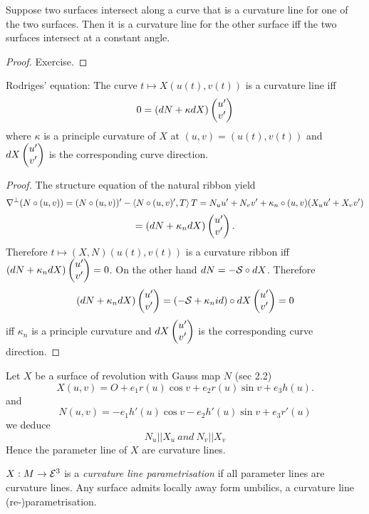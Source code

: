 \begin{theorem}
	Suppose two surfaces intersect along a curve that is a curvature line for one of the two surfaces. Then it is a curvature line for the other surface iff the two surfaces intersect at a constant angle.
\end{theorem}

\begin{proof}
	Exercise.
\end{proof}

\begin{definition}
	Rodriges' equation: The curve $t \mapsto X(u(t),v(t))$ is a curvature line iff 
		\[ 0 = (dN + \kappa  dX) \begin{pmatrix} u'\\v' \end{pmatrix} \]
	where $\kappa$ is a principle curvature of $X$ at $(u,v)= (u(t),v(t))$ and $dX \begin{pmatrix} u'\\v' \end{pmatrix}$ is the corresponding curve direction.
\end{definition}

\begin{proof}
	The structure equation of the natural ribbon yield
		\[ \nabla^\perp (N \circ (u,v)) = (N \circ (u,v))' - \left \langle N \circ (u,v)',T \right\rangle T
			= N_uu' + N_vv'+ \kappa_n\circ (u,v)(X_uu' + X_vv') \]
		\[ = (dN + \kappa_n dX)\begin{pmatrix} u'\\v' \end{pmatrix}. \]
	Therefore $t \mapsto (X,N)(u(t),v(t))$ is a curvature ribbon iff $(dN + \kappa_n dX) \begin{pmatrix} u'\\v' \end{pmatrix}=0$.
	On the other hand $dN = -\mathcal S \circ dX$. Therefore
		\[ (dN + \kappa_n dX)\begin{pmatrix} u'\\v' \end{pmatrix} = (-\mathcal S + \kappa_n id ) \circ dX \begin{pmatrix} u'\\v' \end{pmatrix} =0 \]
	iff $\kappa_n$ is a principle curvature and $dX \begin{pmatrix} u'\\v' \end{pmatrix}$ is the corresponding curve direction. 
\end{proof}

\begin{example}
	Let $X$ be a surface of revolution with Gauss map $N$ (sec 2.2)
		\[ X(u,v)= O + e_1 r(u) \cos v + e_2 r(u) \sin v + e_3 h(u). \]
	and 
		\[ N(u,v) = -e_1 h'(u) \cos v - e_2 h'(u) \sin v + e_3 r'(u) \]
	we deduce
		\[ N_u || X_u \ and \ N_v || X_v \]
	Hence the parameter line of $X$ are curvature lines.
\end{example}

\begin{theorem, definition}
	$X: M \to \mathcal E^3$ is a \emph{curvature line parametrisation} if all parameter lines are curvature lines. Any surface admits locally away form umbilics, a curvature line (re-)parametrisation.
\end{theorem, definition}

